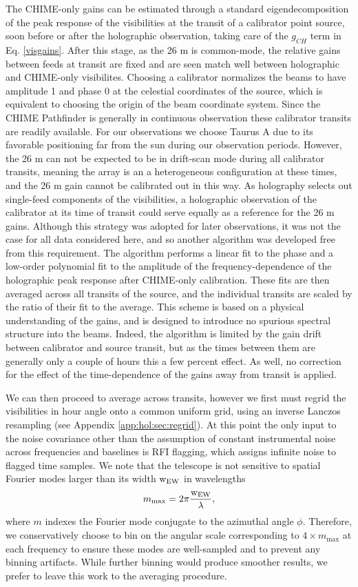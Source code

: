 The CHIME-only gains can be estimated through a standard eigendecomposition of the peak response of the visibilities at the transit of a calibrator point source, soon before or after the holographic observation, taking care of the $g_{CH}$ term in Eq. \ref{visgains}. After this stage, as the 26 m is common-mode, the relative gains between feeds at transit are fixed and are seen match well between holographic and CHIME-only visibilites. Choosing a calibrator normalizes the beams to have amplitude 1 and phase 0 at the celestial coordinates of the source, which is equivalent to choosing the origin of the beam coordinate system. Since the CHIME Pathfinder is generally in continuous observation these calibrator transits are readily available. For our observations we choose Taurus A due to its favorable positioning far from the sun during our observation periods. However, the 26 m can not be expected to be in drift-scan mode during all calibrator transits, meaning the array is an a heterogeneous configuration at these times, and the 26 m gain cannot be calibrated out in this way. As holography selects out single-feed components of the visibilities, a holographic observation of the calibrator at its time of transit could serve equally as a reference for the 26 m gains. Although this strategy was adopted for later observations, it was not the case for all data considered here, and so another algorithm was developed free from this requirement. The algorithm performs a linear fit to the phase and a low-order polynomial fit to the amplitude of the frequency-dependence of the holographic peak response after CHIME-only calibration. These fits are then averaged across all transits of the source, and the individual transits are scaled by the ratio of their fit to the average. This scheme is based on a physical understanding of the gains, and is designed to introduce no spurious spectral structure into the beams. Indeed, the algorithm is limited by the gain drift between calibrator and source transit, but as the times between them are generally only a couple of hours this a few percent effect. As well, no correction for the effect of the time-dependence of the gains away from transit is applied.

We can then proceed to average across transits, however we first must regrid the visibilities in hour angle onto a common uniform grid, using an inverse Lanczos resampling (see Appendix \ref{app:hol:sec:regrid}). At this point the only input to the noise covariance other than the assumption of constant instrumental noise across frequencies and baselines is RFI flagging, which assigns infinite noise to flagged time samples. We note that the telescope is not sensitive to spatial Fourier modes larger than its width ${\rm w_{EW}}$ in wavelengths
\begin{equation}
m_{\rm max} = 2\pi \frac{\rm w_{EW}}{\lambda},
\end{equation}
where $m$ indexes the Fourier mode conjugate to the azimuthal angle $\phi$. Therefore, we conservatively choose to bin on the angular scale corresponding to $4\times m_{\max}$ at each frequency to ensure these modes are well-sampled and to prevent any binning artifacts. While further binning would produce smoother results, we prefer to leave this work to the averaging procedure. 

